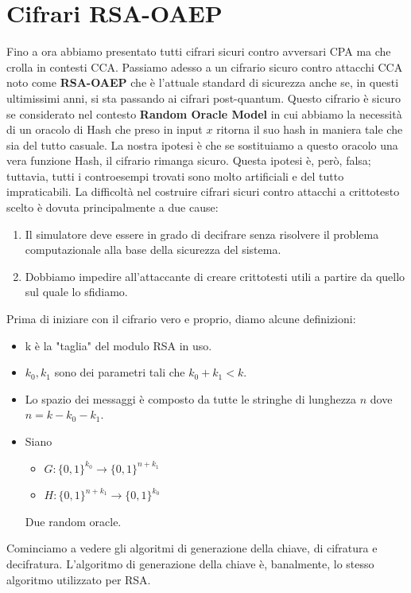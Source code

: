 \section{Cifrari RSA-OAEP}
Fino a ora abbiamo presentato tutti cifrari sicuri contro avversari CPA ma che crolla in contesti CCA. Passiamo adesso a un cifrario sicuro contro attacchi CCA noto come \textbf{RSA-OAEP} che è l'attuale standard di sicurezza anche se, in questi ultimissimi anni, si sta passando ai cifrari post-quantum.
Questo cifrario è sicuro se considerato nel contesto \textbf{Random Oracle Model} in cui abbiamo la necessità di un oracolo di Hash che preso in input $x$ ritorna il suo hash in maniera tale che sia del tutto casuale. La nostra ipotesi è che se sostituiamo a questo oracolo una vera funzione Hash, il cifrario rimanga sicuro. Questa ipotesi è, però, falsa; tuttavia, tutti i controesempi trovati sono molto artificiali e del tutto impraticabili. 
La difficoltà nel costruire cifrari sicuri contro attacchi a crittotesto scelto è dovuta principalmente a due cause:
\begin{enumerate}
    \item Il simulatore deve essere in grado di decifrare senza risolvere il problema computazionale alla base della sicurezza del sistema.
    \item Dobbiamo impedire all'attaccante di creare crittotesti utili a partire da quello sul quale lo sfidiamo.
\end{enumerate}
Prima di iniziare con il cifrario vero e proprio, diamo alcune definizioni:
\begin{itemize}
    \item k è la "taglia" del modulo RSA in uso.
    \item $k_0,k_1$ sono dei parametri tali che $k_0+k_1<k$.
    \item Lo spazio dei messaggi è composto da tutte le stringhe di lunghezza $n$ dove $n=k-k_0-k_1$.
    \item Siano 
    \begin{itemize}
        \item $G:\{0,1\}^{k_0}\rightarrow \{0,1\}^{n+k_1}$
        \item $H:\{0,1\}^{n+k_1} \rightarrow \{0,1\}^{k_0}$
    \end{itemize}
    Due random oracle.
\end{itemize}
Cominciamo a vedere gli algoritmi di generazione della chiave, di cifratura e decifratura. L'algoritmo di generazione della chiave è, banalmente, lo stesso algoritmo utilizzato per RSA.  

